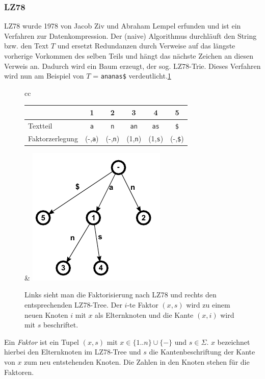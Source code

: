 \documentclass[a4paper,11pt]{scrartcl}%
\theoremstyle{nonumberplain}
\theoremstyle{change}
\theoremstyle{nonumberplain}
\theoremstyle{change}
\theoremstyle{nonumberplain}
\begin{document}
	\subsubsection{LZ78}
	LZ78 wurde 1978 von Jacob Ziv und Abraham Lempel erfunden und ist ein Verfahren zur Datenkompression. Der (naive) Algorithmus durchläuft den String bzw. den Text $T$ und ersetzt Redundanzen durch Verweise auf das längste vorherige Vorkommen des selben Teils und hängt das nächste Zeichen an diesen Verweis an. Dadurch wird ein Baum erzeugt, der sog. LZ78-Trie. Dieses Verfahren wird nun am Beispiel von $T$ = \texttt{ananas\$} verdeutlicht.\ref{fig:lz78}
	\begin{figure}[h]
	\begin{tabular}[t]{cc}
		\begin{tabular}[b]{l c c c c c}\hline
			& 1 & 2 & 3 & 4 & 5 \\ \hline
		   Textteil & \texttt{a} & \texttt{n} & \texttt{an} & \texttt{as} & \texttt{\$}\\ \hline
		   Faktorzerlegung & (-,\texttt{a}) & (-,\texttt{n}) & (1,\texttt{n}) & (1,\texttt{s}) &  (-,\texttt{\$})\\ \hline
		\end{tabular} & \includegraphics{ananas_LZ78Tree}
	\end{tabular}
	\caption{Links sieht man die Faktorisierung nach LZ78 und rechts den entsprechenden LZ78-Tree. Der $i$-te Faktor $(x,s)$ wird zu einem neuen Knoten $i$ mit $x$ als Elternknoten und die Kante $(x,i)$ wird mit $s$ beschriftet.}
	\label{fig:lz78}
	\end{figure}
	
	Ein \textit{Faktor} ist ein Tupel $(x,s)$ mit $x \in \{1..n\} \cup \{-\}$ und $s \in \Sigma$. $x$ bezeichnet hierbei den Elternknoten im LZ78-Tree und $s$ die Kantenbeschriftung der Kante von $x$ zum neu entstehenden Knoten. Die Zahlen in den Knoten stehen für die Faktoren. \cite[8-10]{ciss}
	
\end{document}
